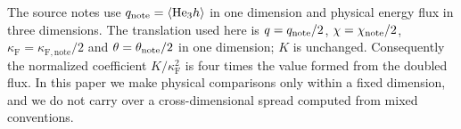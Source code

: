 \documentclass[11pt]{article}
\newcommand{\av}[1]{\left\langle #1\right\rangle}
\newcommand{\F}{\kappa_{\mathrm F}}
\newcommand{\He}{\mathrm{He}}
\theoremstyle{definition}
\theoremstyle{remark}
\numberwithin{equation}{section}
\begin{document}
The source notes use $q_{\rm note}=\av{\He_3h}$ in one dimension and
physical energy flux in three dimensions. The translation used here is
$q=q_{\rm note}/2$, $\chi=\chi_{\rm note}/2$,
$\F=\kappa_{\mathrm{F,note}}/2$ and $\theta=\theta_{\rm note}/2$ in one dimension;
$K$ is unchanged. Consequently the normalized coefficient
$K/\F^2$ is four times the value formed from the doubled flux.
In this paper we make physical comparisons only within a fixed
dimension, and we do not carry over a cross-dimensional spread computed
from mixed conventions.

\FloatBarrier

\begingroup
{}

\endgroup
\end{document}
